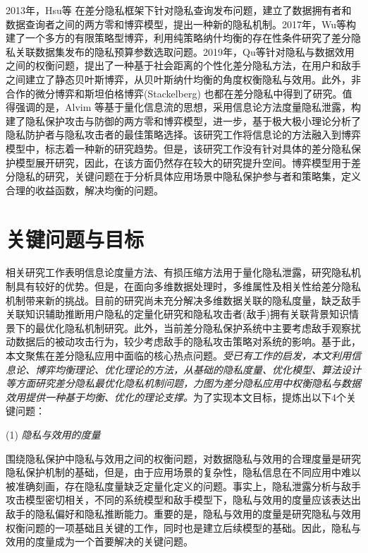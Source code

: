 2013年，Hsu等\cite{hsu2013differential} 在差分隐私框架下针对隐私查询发布问题，建立了数据拥有者和数据查询者之间的两方零和博弈模型，提出一种新的隐私机制。2017年，Wu等\cite{Wu2017Game}构建了一个多方的有限策略型博弈，利用纯策略纳什均衡的存在性条件\cite{Glicksberg1952A}研究了差分隐私关联数据集发布的隐私预算参数选取问题。2019年，Qu等\cite{cui2019improving}针对隐私与数据效用之间的权衡问题，提出了一种基于社会距离的个性化差分隐私方法，在用户和敌手之间建立了静态贝叶斯博弈，从贝叶斯纳什均衡的角度权衡隐私与效用。此外，非合作的微分博弈\cite{gao2019a}和斯坦伯格博弈(Stackelberg)\cite{fioretto2020differential,shokri2015privacy} 也都在差分隐私中得到了研究。值得强调的是，Alvim 等\cite{alvim2017information,alvim2018leakage}基于量化信息流的思想，采用信息论方法度量隐私泄露，构建了隐私保护攻击与防御的两方零和博弈模型，进一步，基于极大极小理论\cite{du1995minimax}分析了隐私防护者与隐私攻击者的最佳策略选择。该研究工作将信息论的方法融入到博弈模型中，标志着一种新的研究趋势。但是，该研究工作没有针对具体的差分隐私保护模型展开研究，因此，在该方面仍然存在较大的研究提升空间。博弈模型用于差分隐私的研究，关键问题在于分析具体应用场景中隐私保护参与者和策略集，定义合理的收益函数，解决均衡的问题。

\section{关键问题与目标}



相关研究工作表明信息论度量方法、有损压缩\cite{xiong2016randomized,sarwate2014a}方法用于量化隐私泄露，研究隐私机制具有较好的优势。但是，在面向多维数据处理时，多维属性及相关性给差分隐私机制带来新的挑战。目前的研究尚未充分解决多维数据关联的隐私度量，缺乏敌手关联知识辅助推断用户隐私的定量化研究和隐私攻击者(敌手)拥有关联背景知识情景下的最优化隐私机制研究。此外，当前差分隐私保护系统中主要考虑敌手观察扰动数据后的被动攻击行为\cite{alvim2017information}，较少考虑敌手的隐私攻击策略对系统的影响。基于此，本文聚焦在差分隐私应用中面临的核心热点问题。{\em 受已有工作的启发，本文利用信息论、博弈均衡理论、优化理论的方法，从基础的隐私度量、优化模型、算法设计等方面研究差分隐私最优化隐私机制问题，力图为差分隐私应用中权衡隐私与数据效用提供一种基于均衡、优化的理论支撑。}为了实现本文目标，提炼出以下4个关键问题：


(1) {\em 隐私与效用的度量}

围绕隐私保护中隐私与效用之间的权衡问题，对数据隐私与效用的合理度量是研究隐私保护机制的基础，但是，由于应用场景的复杂性，隐私信息在不同应用中难以被准确刻画，存在隐私度量缺乏定量化定义\cite{Lifenghua16}的问题。事实上，隐私泄露分析与敌手攻击模型密切相关，不同的系统模型和敌手模型下，隐私与效用的度量应该表达出敌手的隐私偏好和隐私推断能力。重要的是，隐私与效用的度量是研究隐私与效用权衡问题的一项基础且关键的工作，同时也是建立后续模型的基础。因此，隐私与效用的度量成为一个首要解决的关键问题。

